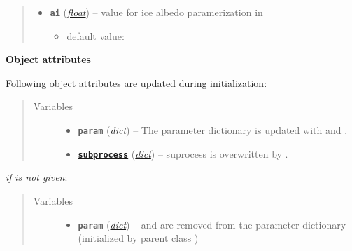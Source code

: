 \documentclass[letterpaper,10pt,english]{sphinxmanual}
\begin{document}
\begin{fulllineitems}
\begin{quote}
\begin{description}
\begin{itemize}
\item {} 
\textbf{\texttt{ai}} (\href{http://docs.python.org/2.7/library/functions.html\#float}{\emph{float}}) -- 
value for ice albedo paramerization in
{\hyperref[api/climlab.surface:climlab.surface.albedo.StepFunctionAlbedo]{\emph{}}}
\begin{itemize}
\item {} 
default value: 

\end{itemize}


\end{itemize}

\end{description}\end{quote}

\textbf{Object attributes}

Following object attributes are updated during initialization:
\begin{quote}\begin{description}
\item[{Variables}] \leavevmode\begin{itemize}
\item {} 
\textbf{\texttt{param}} (\href{http://docs.python.org/2.7/library/stdtypes.html\#dict}{\emph{dict}}) -- The parameter dictionary is updated with 
 and .

\item {} 
\href{http://docs.python.org/2.7/library/subprocess.html\#module-subprocess}{\textbf{\texttt{subprocess}}} (\href{http://docs.python.org/2.7/library/stdtypes.html\#dict}{\emph{dict}}) -- suprocess  is overwritten by
{\hyperref[api/climlab.radiation:climlab.radiation.insolation.DailyInsolation]{\emph{}}}.

\end{itemize}

\end{description}\end{quote}

\emph{if}  \emph{is not given}:
\begin{quote}\begin{description}
\item[{Variables}] \leavevmode\begin{itemize}
\item {} 
\textbf{\texttt{param}} (\href{http://docs.python.org/2.7/library/stdtypes.html\#dict}{\emph{dict}}) --  and  are removed from the 
parameter dictionary (initialized by parent class
{\hyperref[api/climlab.model:climlab.model.ebm.EBM]{\emph{}}})


\end{itemize}
\end{description}
\end{quote}
\end{fulllineitems}
\end{document}
